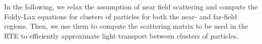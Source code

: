 In the following, we relax the assumption of near field scattering and compute the Foldy-Lax equations for clusters of particles for both the near- and far-field regions. Then, we use them to compute the scattering matrix to be used in the RTE to efficiently approximate light transport between clusters of particles. 
